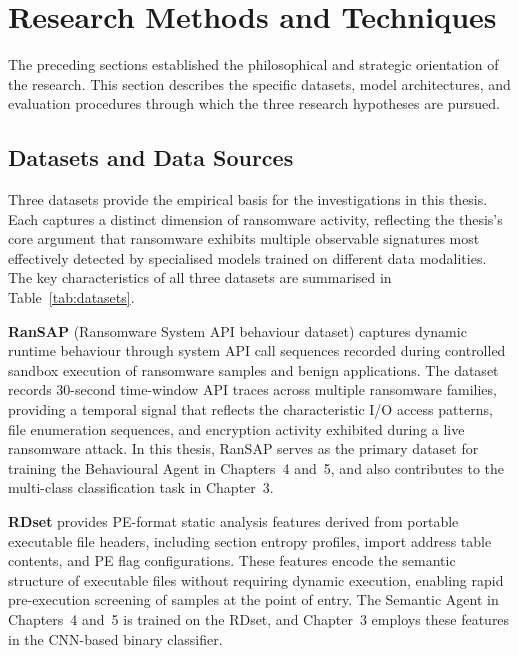 \section{Research Methods and Techniques}
\label{sec:methods}

The preceding sections established the philosophical and strategic orientation of the research.
This section describes the specific datasets, model architectures, and evaluation procedures
through which the three research hypotheses are pursued.

\subsection{Datasets and Data Sources}
\label{sec:datasets}

Three datasets provide the empirical basis for the investigations in this thesis.
Each captures a distinct dimension of ransomware activity, reflecting the thesis's core
argument that ransomware exhibits multiple observable signatures most effectively detected by
specialised models trained on different data modalities.
The key characteristics of all three datasets are summarised in Table~\ref{tab:datasets}.

\textbf{RanSAP} (Ransomware System API behaviour dataset) \cite{hirano2022ransap} captures
dynamic runtime behaviour through system API call sequences recorded during controlled sandbox
execution of ransomware samples and benign applications.
The dataset records 30-second time-window API traces across multiple ransomware families,
providing a temporal signal that reflects the characteristic I/O access patterns, file
enumeration sequences, and encryption activity exhibited during a live ransomware attack.
In this thesis, RanSAP serves as the primary dataset for training the Behavioural Agent in
Chapters~4 and~5, and also contributes to the multi-class classification task in Chapter~3.

\textbf{RDset} provides PE-format static analysis features derived from portable executable
file headers, including section entropy profiles, import address table contents, and PE
flag configurations.
These features encode the semantic structure of executable files without requiring dynamic
execution, enabling rapid pre-execution screening of samples at the point of entry.
The Semantic Agent in Chapters~4 and~5 is trained on the RDset, and Chapter~3 employs these
features in the CNN-based binary classifier.

